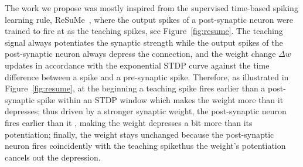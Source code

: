 The work we propose was mostly inspired from the supervised time-based spiking learning rule, ReSuMe~\DIFdelbegin {}\DIFdelend \DIFaddbegin {}\DIFaddend , where the output spikes of a post-synaptic neuron were trained to fire at \DIFdelbegin {}\DIFdelend \DIFaddbegin {}\DIFaddend as the teaching spikes\DIFdelbegin {}\DIFdelend , see Figure~\ref{fig:resume}.
The teaching signal always potentiates the synaptic strength while the output spikes of the post-synaptic neuron always depress the connection, and the weight change $\Delta w$ updates in accordance with the exponential STDP curve against the time difference between a spike and a pre-synaptic spike.
Therefore, as illustrated in Figure~\ref{fig:resume}, at the beginning a teaching spike fires earlier than a post-synaptic spike within an STDP window which makes the weight \DIFdelbegin {}\DIFdelend \DIFaddbegin {}\DIFaddend more than it depresses;
thus driven by a stronger synaptic weight, the post-synaptic neuron fires earlier than it \DIFdelbegin {}\DIFdelend \DIFaddbegin {}\DIFaddend , making the weight depresses a bit more than its potentiation;
finally, the weight stays unchanged because the post-synaptic neuron fires coincidently with the teaching spike\DIFaddbegin \DIFadd{, }\DIFaddend thus the weight's potentiation cancels out the depression.
